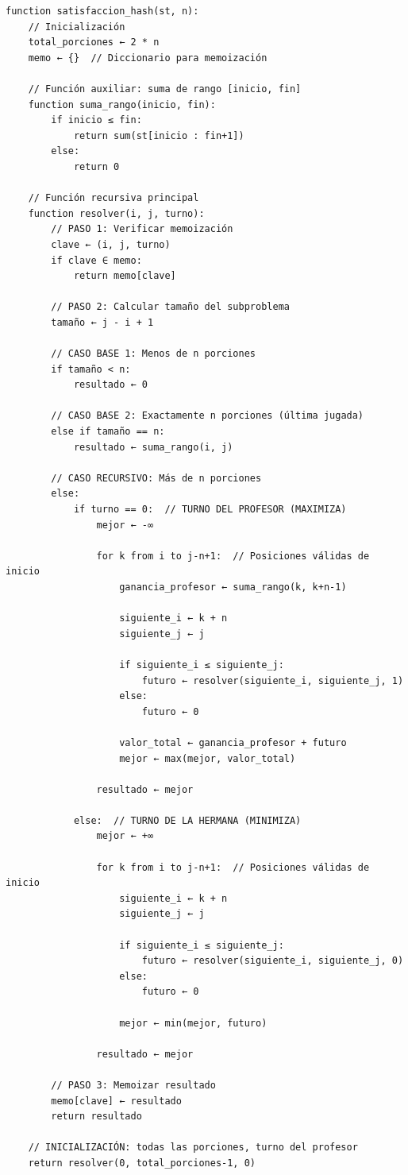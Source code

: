 \documentclass[12pt,letterpaper]{article}
\begin{document}
\begin{lstlisting}
function satisfaccion_hash(st, n):
    // Inicialización
    total_porciones ← 2 * n
    memo ← {}  // Diccionario para memoización

    // Función auxiliar: suma de rango [inicio, fin]
    function suma_rango(inicio, fin):
        if inicio ≤ fin:
            return sum(st[inicio : fin+1])
        else:
            return 0

    // Función recursiva principal
    function resolver(i, j, turno):
        // PASO 1: Verificar memoización
        clave ← (i, j, turno)
        if clave ∈ memo:
            return memo[clave]

        // PASO 2: Calcular tamaño del subproblema
        tamaño ← j - i + 1

        // CASO BASE 1: Menos de n porciones
        if tamaño < n:
            resultado ← 0

        // CASO BASE 2: Exactamente n porciones (última jugada)
        else if tamaño == n:
            resultado ← suma_rango(i, j)

        // CASO RECURSIVO: Más de n porciones
        else:
            if turno == 0:  // TURNO DEL PROFESOR (MAXIMIZA)
                mejor ← -∞

                for k from i to j-n+1:  // Posiciones válidas de inicio
                    ganancia_profesor ← suma_rango(k, k+n-1)

                    siguiente_i ← k + n
                    siguiente_j ← j

                    if siguiente_i ≤ siguiente_j:
                        futuro ← resolver(siguiente_i, siguiente_j, 1)
                    else:
                        futuro ← 0

                    valor_total ← ganancia_profesor + futuro
                    mejor ← max(mejor, valor_total)

                resultado ← mejor

            else:  // TURNO DE LA HERMANA (MINIMIZA)
                mejor ← +∞

                for k from i to j-n+1:  // Posiciones válidas de inicio
                    siguiente_i ← k + n
                    siguiente_j ← j

                    if siguiente_i ≤ siguiente_j:
                        futuro ← resolver(siguiente_i, siguiente_j, 0)
                    else:
                        futuro ← 0

                    mejor ← min(mejor, futuro)

                resultado ← mejor

        // PASO 3: Memoizar resultado
        memo[clave] ← resultado
        return resultado

    // INICIALIZACIÓN: todas las porciones, turno del profesor
    return resolver(0, total_porciones-1, 0)
\end{lstlisting}
\end{document}
